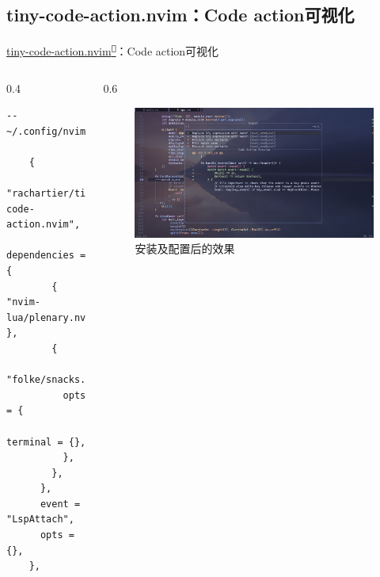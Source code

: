 \documentclass[aspectratio=169]{ctexbeamer}
\newcommand{\nerd}[1]{\texttt{#1}}
\newcommand{\link}[3][]{\href{#3}{#2\textsuperscript{\nerd{}}}}
\begin{document}
\subsection{tiny-code-action.nvim：Code action可视化}
\begin{frame}[fragile]{\link{tiny-code-action.nvim}{https://github.com/rachartier/tiny-code-action.nvim}：Code action可视化}
  \begin{columns}
    \begin{column}{0.4\linewidth}
        \begin{lstlisting}[basicstyle=\tiny\ttfamily]
    -- ~/.config/nvim/lua/plugins/ui.lua

    {
      "rachartier/tiny-code-action.nvim",
      dependencies = {
        { "nvim-lua/plenary.nvim" },
        {
          "folke/snacks.nvim",
          opts = {
            terminal = {},
          },
        },
      },
      event = "LspAttach",
      opts = {},
    },
        \end{lstlisting}
    \end{column}

    \begin{column}{0.6\linewidth}
      \begin{figure}[H]
        \centering
        \includegraphics[width=\linewidth]{./Figures/TinyCodeAction_Finish.jpg}
        \caption{安装及配置后的效果}%
      \end{figure}
    \end{column}
  \end{columns}
\end{frame}
\end{document}
